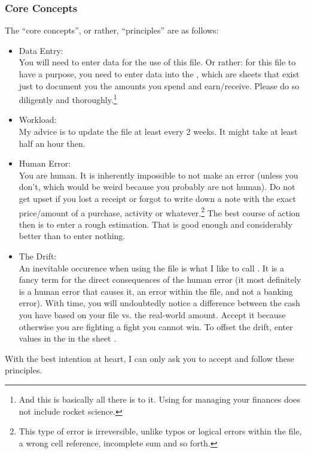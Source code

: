 \subsubsection{Core Concepts}
\label{subsubsec:core-concepts}

The ``core concepts'', or rather, ``principles'' are as follows:
\begin{itemize}
	\item Data Entry:\\
	You will need to enter data for the use of this file.
	Or rather: for this file to have a purpose, you need to enter data into the , which are sheets that exist just to document you the amounts you spend and earn/receive.
	Please do so diligently and thoroughly.\footnote{And this is basically all there is to it.
	Using \tfn for managing your finances does not include rocket science.}
	\item Workload:\\
	My advice is to update the file at least every 2 weeks.
	It might take at least half an hour then.
	\item Human Error:\\
	You are human.
	It is inherently impossible to not make an error (unless you don't, which would be weird because you probably are not human).
	Do not get upset if you lost a receipt or forgot to write down a note with the exact price/amount of a purchase, activity or whatever.\footnote{This type of error is irreversible, unlike typos or logical errors within the file, \eg a wrong cell reference, incomplete sum and so forth.}
	The best course of action then is to enter a rough estimation.
	That is good enough and considerably better than to enter nothing.
	\item The Drift:\\
	An inevitable occurence when using the file is what I like to call .
	It is a fancy term for the direct consequences of the human error (it most definitely is a human error that causes it, \ie an error within the file, and not a banking error).
	With time, you will undoubtedly notice a difference between the cash you have based on your file vs. the real-world amount.
	Accept it because otherwise you are fighting a fight you cannot win.
	To offset the drift, enter values in the  in the sheet .
\end{itemize}
With the best intention at heart, I can only ask you to accept and follow these principles.

